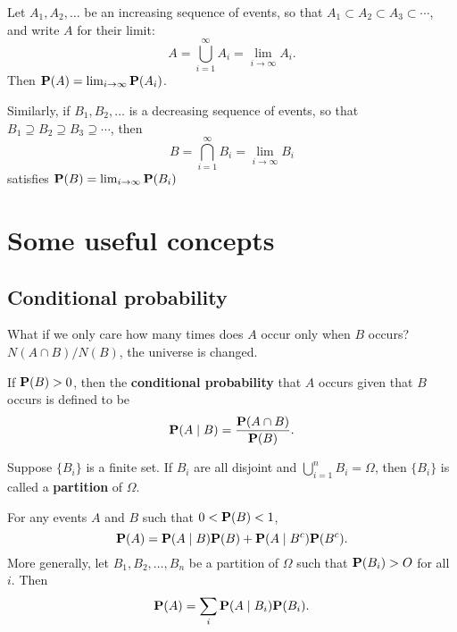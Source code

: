 \begin{lemma}
Let $A_1, A_2, \dots$ be an increasing sequence of events, so that $A_1 \subset A_2 \subset A_3 \subset \cdots$, and write $A$ for their limit:
\begin{equation*}
    A = \bigcup_{i=1}^\infty A_i = \lim_{i \to \infty} A_i.
\end{equation*}
Then $\mathbf{P}(A) = \lim_{i\to\infty} \mathbf{P}(A_i)$. 

Similarly, if $B_1, B_2, \dots$ is a decreasing sequence of events, so that $B_1 \supseteq  B_2 \supseteq B_3 \supseteq \cdots$, then 
\begin{equation*}
    B = \bigcap_{i=1}^\infty B_i = \lim_{i \to \infty} B_i
\end{equation*}
satisfies $\mathbf{P}(B) = \lim_{i\to\infty} \mathbf{P}(B_i)$
\end{lemma}


\section{Some useful concepts}
\subsection{Conditional probability}
What if we only care how many times does $A$ occur only when $B$ occurs? $N(A\cap B) / N(B)$, the universe is changed. 
\begin{definition}
If $\mathbf{P}(B) > 0$, then the \textbf{conditional probability} that $A$ occurs given that $B$ occurs is defined to be
\begin{equation*}
    \mathbf{P}(A \;\vert\; B) = \frac{\mathbf{P}(A \cap B)}{\mathbf{P}(B)}.
\end{equation*}
\end{definition}

\begin{definition}
Suppose $\{B_i\}$ is a finite set. If $B_i$ are all disjoint and $\bigcup_{i=1}^n B_i = \Omega$, then $\{B_i\}$ is called a \textbf{partition} of $\Omega$.
\end{definition}

\begin{lemma}
For any events $A$ and $B$ such that $0 < \mathbf{P}(B) < 1$,
\begin{equation*}
    \mathbf{P}(A) = \mathbf{P}(A \;\vert\; B) \mathbf{P}(B) + \mathbf{P}(A \;\vert\; B^c) \mathbf{P}(B^c).
\end{equation*}
More generally, let $B_1,  B_2, \dots, B_n$ be a partition of $\Omega$ such that $\mathbf{P}(B_i) > O$ for all $i$. Then 
\begin{equation*}
    \mathbf{P}(A) = \sum_i \mathbf{P}(A \;\vert\; B_i) \mathbf{P}(B_i).
\end{equation*}
\end{lemma}

